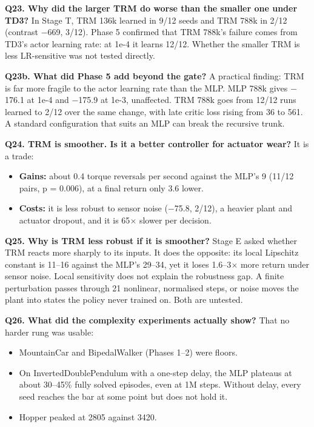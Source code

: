 \documentclass[11pt]{article}
\begin{document}
\textbf{Q23. Why did the larger TRM do worse than the smaller one under TD3?} In Stage T, TRM 136k learned in 9/12 seeds and TRM 788k in 2/12 (contrast $-$669, 3/12). Phase 5 confirmed that TRM 788k's failure comes from TD3's actor learning rate: at 1e-4 it learns 12/12. Whether the smaller TRM is less LR-sensitive was not tested directly.



\textbf{Q23b. What did Phase 5 add beyond the gate?} A practical finding: TRM is far more fragile to the actor learning rate than the MLP. MLP 788k gives $-$176.1 at 1e-4 and $-$175.9 at 1e-3, unaffected. TRM 788k goes from 12/12 runs learned to 2/12 over the same change, with late critic loss rising from 36 to 561. A standard configuration that suits an MLP can break the recursive trunk.



\textbf{Q24. TRM is smoother. Is it a better controller for actuator wear?} It is a trade:

\begin{itemize}
\item \textbf{Gains:} about 0.4 torque reversals per second against the MLP's 9 (11/12 pairs, p = 0.006), at a final return only 3.6 lower.
\item \textbf{Costs:} it is less robust to sensor noise ($-$75.8, 2/12), a heavier plant and actuator dropout, and it is 65$\times$ slower per decision.
\end{itemize}



\textbf{Q25. Why is TRM less robust if it is smoother?} Stage E asked whether TRM reacts more sharply to its inputs. It does the opposite: its local Lipschitz constant is 11--16 against the MLP's 29--34, yet it loses 1.6--3$\times$ more return under sensor noise. Local sensitivity does not explain the robustness gap. A finite perturbation passes through 21 nonlinear, normalised steps, or noise moves the plant into states the policy never trained on. Both are untested.



\textbf{Q26. What did the complexity experiments actually show?} That no harder rung was usable:

\begin{itemize}
\item MountainCar and BipedalWalker (Phases 1--2) were floors.
\item On InvertedDoublePendulum with a one-step delay, the MLP plateaus at about 30--45\% fully solved episodes, even at 1M steps. Without delay, every seed reaches the bar at some point but does not hold it.
\item Hopper peaked at 2805 against 3420.
\end{itemize}
\end{document}
